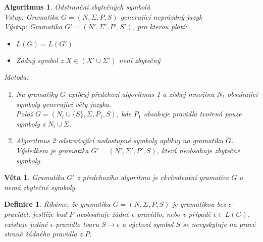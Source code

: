\documentclass[a4paper, 11pt]{report}
\newtheorem{mydef}{Definice}[chapter]
\newtheorem{veta}{Věta}[chapter]
\newtheorem{alg}{Algoritmus}[chapter]
\begin{document}
\begin{alg}
Odstranění zbytečných symbolů\\
Vstup: Gramatika $G = (N, \Sigma, P, S)$ generující neprázdný jazyk\\
Výstup: Gramatika $G' = (N', \Sigma', P', S')$, pro kterou platí:
\begin{itemize}
	\item $L(G) = L(G')$
	\item Žádný symbol z $X \in (X' \cup \Sigma')$ není zbytečný
\end{itemize}
Metoda:
\begin{enumerate}
	\item Na gramatiky $G$ aplikuj předchozí algoritmus 1 a získej množinu $N_t$ obsahující symboly generující věty jazyka.\\
	Polož $\overline{G} = (N_t \cup \{S\}, \Sigma, P_1, S)$, kde $P_1$ obsahuje pravidla tvořená pouze symboly z $N_t \cup \Sigma$.
	\item Algoritmus 2 odstraňující nedostupné symboly aplikuj na gramatiku $\overline{G}$. Výsledkem je gramatika $G' = (N', \Sigma', P', S)$, která neobsahuje zbytečné symboly.
\end{enumerate}
\end{alg}

\begin{veta}
Gramatika $G'$ z předchozího algoritmu je ekvivalentní gramatice  $G$ a nemá zbytečné symboly.
\end{veta}

\begin{mydef}
Říkáme, že gramatika $G = (N, \Sigma, P, S)$ je \emph{gramatikou bez $\epsilon$-pravidel}, jestliže buď $P$ neobsahuje žádné $\epsilon$-pravidlo, nebo v případě $\epsilon \in L(G)$, existuje jediné $\epsilon$-pravidlo tvaru $S \to \epsilon$ a výchozí symbol $S$ se nevyskytuje na pravé straně žádného pravidla z $P$.
\end{mydef}
\end{document}
